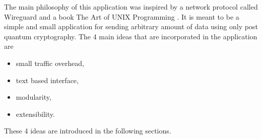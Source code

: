 The main philosophy of this application was inspired by a network protocol called Wireguard \cite{Donenfeld2020} and a book The Art of UNIX Programming \cite{Raymond2003}. It is meant to be a simple and small application for sending arbitrary amount of data using only post quantum cryptography. The 4 main ideas that are incorporated in the application are
\begin{itemize}
  \item small traffic overhead,
  \item text based interface,
  \item modularity,
  \item extensibility.
\end{itemize}
These 4 ideas are introduced in the following sections.


